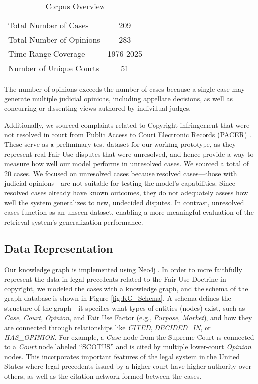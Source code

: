 \begin{table}[h!]
  \centering
  \caption{Corpus Overview}
  \begin{tabular}{lc}
    \toprule
    Total Number of Cases & 209 \\
    Total Number of Opinions & 283 \\
    Time Range Coverage & 1976-2025\\
    Number of Unique Courts & 51 \\
    \bottomrule
  \end{tabular}
\end{table}

The number of opinions exceeds the number of cases because a single case may generate multiple judicial opinions, including appellate decisions, as well as concurring or dissenting views authored by individual judges.

Additionally, we sourced complaints related to Copyright infringement that were not resolved in court from Public Access to Court Electronic Records (PACER) \cite{26_PACER}. These serve as a preliminary test dataset for our working prototype, as they represent real Fair Use disputes that were unresolved, and hence provide a way to measure how well our model performs in unresolved cases. We sourced a total of 20 cases. We focused on unresolved cases because resolved cases—those with judicial opinions—are not suitable for testing the model's capabilities. Since resolved cases already have known outcomes, they do not adequately assess how well the system generalizes to new, undecided disputes. In contrast, unresolved cases function as an unseen dataset, enabling a more meaningful evaluation of the retrieval system's generalization performance.

\subsection{Data Representation}
\label{sec: data_representation_KG}

Our knowledge graph is implemented using Neo4j \cite{27_neo4j}. In order to more faithfully represent the data in legal precedents related to the Fair Use Doctrine in copyright, we modeled the cases with a knowledge graph, and the schema of the graph database is shown in Figure \ref{fig:KG_Schema}. A schema defines the structure of the graph—it specifies what types of entities (nodes) exist, such as \textit{Case}, \textit{Court}, \textit{Opinion}, and Fair Use Factor (e.g., \textit{Purpose}, \textit{Market}), and how they are connected through relationships like \textit{CITED}, \textit{DECIDED\_IN}, or \textit{HAS\_OPINION}. For example, a \textit{Case} node from the Supreme Court is connected to a \textit{Court} node labeled ``SCOTUS'' and is cited by multiple lower-court \textit{Opinion} nodes.  This incorporates important features of the legal system in the United States where legal precedents issued by a higher court have higher authority over others, as well as the citation network formed between the cases.

